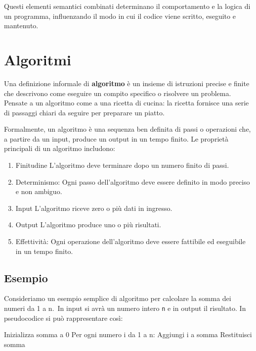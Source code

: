 \documentclass[
  letterpaper,
]{scrbook}
\newenvironment{Shaded}{\begin{snugshade}}{\end{snugshade}}
\newcommand{\NormalTok}[1]{\textcolor[rgb]{0.00,0.23,0.31}{#1}}
\providecommand{\tightlist}{%
  \setlength{\itemsep}{0pt}\setlength{\parskip}{0pt}}\usepackage{longtable,booktabs,array}
\begin{document}
Questi elementi semantici combinati determinano il comportamento e la
logica di un programma, influenzando il modo in cui il codice viene
scritto, eseguito e mantenuto.

\section{Algoritmi}\label{algoritmi}

Una definizione informale di \textbf{algoritmo} è un insieme di
istruzioni precise e finite che descrivono come eseguire un compito
specifico o risolvere un problema. Pensate a un algoritmo come a una
ricetta di cucina: la ricetta fornisce una serie di passaggi chiari da
seguire per preparare un piatto.

Formalmente, un algoritmo è una sequenza ben definita di passi o
operazioni che, a partire da un input, produce un output in un tempo
finito. Le proprietà principali di un algoritmo includono:

\begin{enumerate}
\def\labelenumi{\arabic{enumi}.}
\tightlist
\item
  Finitudine L'algoritmo deve terminare dopo un numero finito di passi.
\item
  Determinismo: Ogni passo dell'algoritmo deve essere definito in modo
  preciso e non ambiguo.
\item
  Input L'algoritmo riceve zero o più dati in ingresso.
\item
  Output L'algoritmo produce uno o più risultati.
\item
  Effettività: Ogni operazione dell'algoritmo deve essere fattibile ed
  eseguibile in un tempo finito.
\end{enumerate}

\subsection{Esempio}\label{esempio}

Consideriamo un esempio semplice di algoritmo per calcolare la somma dei
numeri da 1 a n.~In input si avrà un numero intero \texttt{n} e in
output il risultato. In pseudocodice si può rappresentare così:

\begin{Shaded}
\begin{Highlighting}[]
\NormalTok{Inizializza somma a 0}
\NormalTok{Per ogni numero i da 1 a n:}
\NormalTok{  Aggiungi i a somma}
\NormalTok{Restituisci somma}
\end{Highlighting}
\end{Shaded}
\end{document}
